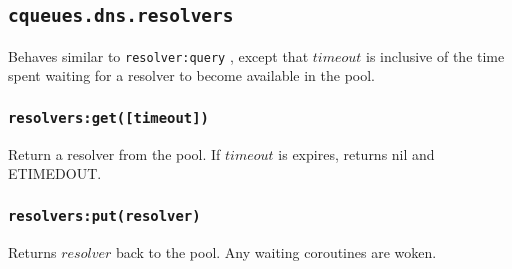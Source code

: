 \documentclass[11pt, oneside]{memoir}
\newcommand{\fn}[1]{\texttt{#1} }
\newcounter{toccols}
\newenvironment{Module}[1]{
	\subsection{\texttt{#1}}
	\addtocontents{toc}{
		\protect\begin{multicols}{\value{toccols}}
	}
}{
	\addtocontents{toc}{\protect\end{multicols}}
}
\begin{document}
\begin{Module}{cqueues.dns.resolvers}
Behaves similar to \fn{resolver:query}, except that $timeout$ is inclusive of the time spent waiting for a resolver to become available in the pool.

\subsubsection[\fn{resolvers:get}]{\fn{resolvers:get([timeout])}}

Return a resolver from the pool. If $timeout$ is expires, returns nil and ETIMEDOUT.

\subsubsection[\fn{resolvers:put}]{\fn{resolvers:put(resolver)}}

Returns $resolver$ back to the pool. Any waiting coroutines are woken.

\end{Module}
\end{document}
